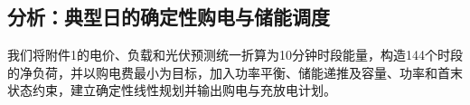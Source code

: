 \subsection{分析：典型日的确定性购电与储能调度}

我们将附件1的电价、负载和光伏预测统一折算为10分钟时段能量，构造144个时段的净负荷，并以购电费最小为目标，加入功率平衡、储能递推及容量、功率和首末状态约束，建立确定性线性规划并输出购电与充放电计划。



